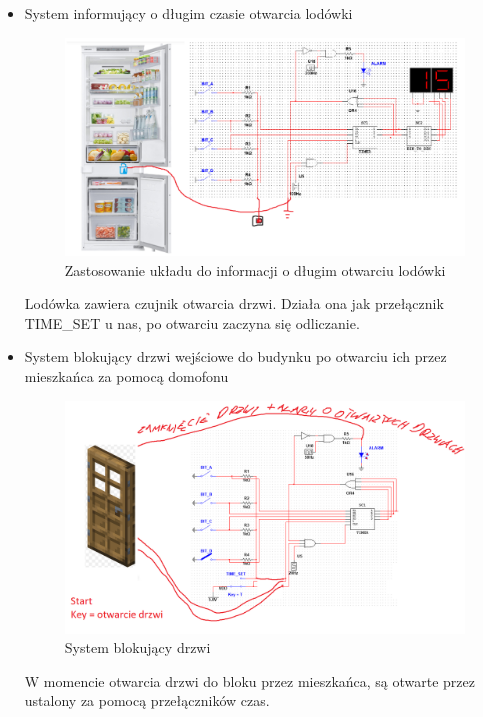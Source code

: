 \documentclass{article}
\begin{document}
    \begin{itemize}
        \item System informujący o długim czasie otwarcia lodówki \begin{figure}[H]
            \centering
            \captionsetup{font=small, skip=2pt}
            \includegraphics[scale=0.7]{images/lodowka}
            \caption{Zastosowanie układu do informacji o długim otwarciu lodówki}
        \end{figure}
        Lodówka zawiera czujnik otwarcia drzwi. Działa ona jak przełącznik TIME\_SET u nas, po otwarciu
        zaczyna się odliczanie.
        \item System blokujący drzwi wejściowe do budynku po otwarciu ich przez mieszkańca za pomocą domofonu
        \begin{figure}[H]
            \centering
            \captionsetup{font=small, skip=2pt}
            \includegraphics[scale=0.3]{images/drzwi}
            \caption{System blokujący drzwi}
        \end{figure}
        W momencie otwarcia drzwi do bloku przez mieszkańca, są otwarte przez ustalony za pomocą przełączników czas.

\end{itemize}
\end{document}
